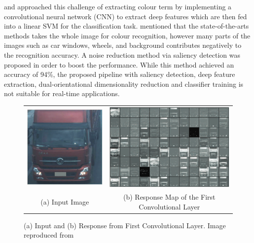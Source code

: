  and  approached this challenge of extracting colour term by implementing a convolutional neural network (CNN) to extract deep features which are then fed into a linear SVM for the classification task.  mentioned that the state-of-the-arts methods takes the whole image for colour recognition, however many parts of the images such as car windows, wheels, and background contributes negatively to the recognition accuracy. A noise reduction method via saliency detection was proposed in order to boost the performance. While this method achieved an accuracy of 94\%, the proposed pipeline with saliency detection, deep feature extraction, dual-orientational dimensionality reduction and classifier training is not suitable for real-time applications.

\begin{figure}[!htb]
  \centering
\begin{tabular}{cc}
 \includegraphics[width=0.4\linewidth]{image/lit/hu1.png}  &
 \includegraphics[width=0.6\linewidth]{image/lit/hu2.png} \\
(a) Input Image &
(b) Response Map of the First Convolutional Layer \\
\end{tabular}
\caption[(a) Input and (b) Response from First Convolutional Layer. ]{(a) Input and (b) Response from First Convolutional Layer. Image reproduced from  \label{fig:responseFCL}}
\end{figure}

